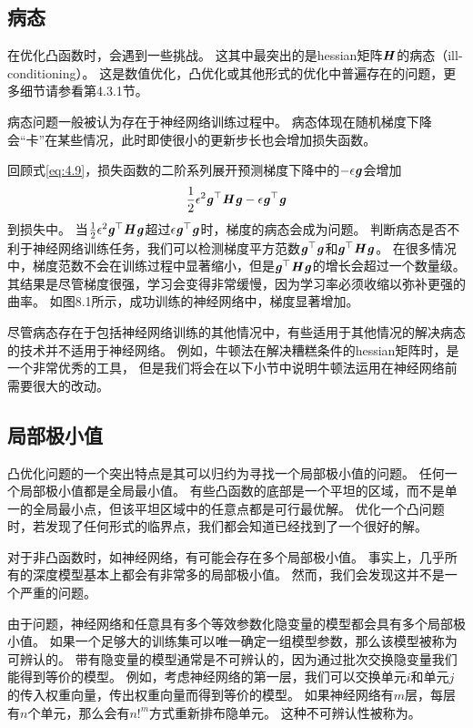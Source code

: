 \subsection{病态}
\label{sec:ill_conditioning}
在优化凸函数时，会遇到一些挑战。
这其中最突出的是\gls{hessian}矩阵$\boldsymbol{\mathit{H}}$的病态（ill-conditioning）。
这是数值优化，凸优化或其他形式的优化中普遍存在的问题，更多细节请参看第4.3.1节。

病态问题一般被认为存在于神经网络训练过程中。
病态体现在随机梯度下降会``卡''在某些情况，此时即使很小的更新步长也会增加损失函数。

回顾式\ref{eq:4.9}，损失函数的二阶系列展开预测梯度下降中的$-\epsilon\boldsymbol{\mathit{g}}$会增加
\begin{equation}
    \frac{1}{2} \epsilon^2 \boldsymbol{\mathit{g}}^\top \boldsymbol{\mathit{H}}\boldsymbol{\mathit{g}} - \epsilon\boldsymbol{\mathit{g}}^\top\boldsymbol{\mathit{g}}
\end{equation}
到损失中。
当$\frac{1}{2} \epsilon^2 \boldsymbol{\mathit{g}}^\top\boldsymbol{\mathit{H}}\boldsymbol{\mathit{g}}$超过$\epsilon\boldsymbol{\mathit{g}}^\top\boldsymbol{\mathit{g}}$时，梯度的病态会成为问题。
判断病态是否不利于神经网络训练任务，我们可以检测梯度平方范数$\boldsymbol{\mathit{g}}^\top\boldsymbol{\mathit{g}}$和$\boldsymbol{\mathit{g}}^\top \boldsymbol{\mathit{H}}\boldsymbol{\mathit{g}}$。
在很多情况中，梯度范数不会在训练过程中显著缩小，但是$\boldsymbol{\mathit{g}}^\top\boldsymbol{\mathit{H}}\boldsymbol{\mathit{g}}$的增长会超过一个数量级。
其结果是尽管梯度很强，学习会变得非常缓慢，因为学习率必须收缩以弥补更强的曲率。
如图8.1所示，成功训练的神经网络中，梯度显著增加。


尽管病态存在于包括神经网络训练的其他情况中，有些适用于其他情况的解决病态的技术并不适用于神经网络。
例如，牛顿法在解决糟糕条件的\gls{hessian}矩阵时，是一个非常优秀的工具，
但是我们将会在以下小节中说明牛顿法运用在神经网络前需要很大的改动。

\subsection{局部极小值}
\label{sec:local_minima}
凸优化问题的一个突出特点是其可以归约为寻找一个局部极小值的问题。
任何一个局部极小值都是全局最小值。
有些凸函数的底部是一个平坦的区域，而不是单一的全局最小点，但该平坦区域中的任意点都是可行最优解。
优化一个凸问题时，若发现了任何形式的临界点，我们都会知道已经找到了一个很好的解。


对于非凸函数时，如神经网络，有可能会存在多个局部极小值。
事实上，几乎所有的深度模型基本上都会有非常多的局部极小值。
然而，我们会发现这并不是一个严重的问题。

由于问题，神经网络和任意具有多个等效参数化隐变量的模型都会具有多个局部极小值。
如果一个足够大的训练集可以唯一确定一组模型参数，那么该模型被称为可辨认的。
带有隐变量的模型通常是不可辨认的，因为通过批次交换隐变量我们能得到等价的模型。
例如，考虑神经网络的第一层，我们可以交换单元$i$和单元$j$的传入权重向量，传出权重向量而得到等价的模型。
如果神经网络有$m$层，每层有$n$个单元，那么会有$n!^m$方式重新排布隐单元。
这种不可辨认性被称为。

